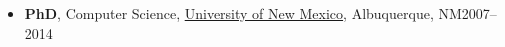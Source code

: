 \documentclass[11pt]{article}
\begin{document}
\begin{itemize}
    
    \item \textbf{PhD}, Computer Science,  \href{https://www.unm.edu}{University of New Mexico}, Albuquerque, NM\hfill 2007--2014
    
    
    
    
    
\end{itemize}

\end{document}
